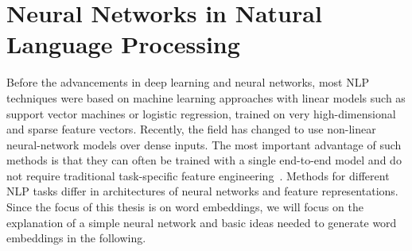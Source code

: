 \section{Neural Networks  in Natural Language Processing }\label{sec:nn}
Before the advancements in deep learning and neural networks, most NLP techniques were based on machine learning approaches with linear models such as support vector machines or logistic regression, trained on very high-dimensional and sparse feature vectors. Recently, the field has changed to use non-linear neural-network models over dense inputs. The most important advantage of such methods is that they can often be trained with a single end-to-end model and do not require traditional task-specific feature engineering~. Methods for different NLP tasks differ in architectures of neural networks and feature representations. Since the focus of this thesis is on word embeddings, we will focus on the explanation of a simple neural network and basic ideas needed to generate word embeddings in the following. 

